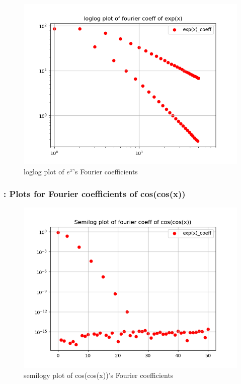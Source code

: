 \documentclass[11pt]{article}
\begin{document}
\begin{figure}[H]
    \centering
    \includegraphics[scale = 0.5]{Figure_4.png}
    \caption{loglog plot of $e^{x}$'s Fourier coefficients}
\end{figure}

\subsubsection{: Plots for Fourier coefficients of cos(cos(x))}

\begin{figure}[H]
    \centering
    \includegraphics[scale = 0.5]{Figure_5.png}
    \caption{semilogy plot of cos(cos(x))'s Fourier coefficients}
\end{figure}
\end{document}
